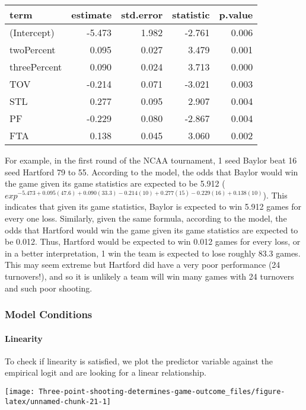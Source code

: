 \documentclass[
]{article}
\begin{document}
\begin{longtable}[]{@{}lrrrr@{}}
\toprule
term & estimate & std.error & statistic & p.value \\
\midrule
\endhead
(Intercept) & -5.473 & 1.982 & -2.761 & 0.006 \\
twoPercent & 0.095 & 0.027 & 3.479 & 0.001 \\
threePercent & 0.090 & 0.024 & 3.713 & 0.000 \\
TOV & -0.214 & 0.071 & -3.021 & 0.003 \\
STL & 0.277 & 0.095 & 2.907 & 0.004 \\
PF & -0.229 & 0.080 & -2.867 & 0.004 \\
FTA & 0.138 & 0.045 & 3.060 & 0.002 \\
\bottomrule
\end{longtable}

For example, in the first round of the NCAA tournament, 1 seed Baylor
beat 16 seed Hartford 79 to 55. According to the model, the odds that
Baylor would win the game given its game statistics are expected to be
5.912
(\(exp^{-5.473 + 0.095(47.6) + 0.090(33.3) - 0.214(10) + 0.277(15) - 0.229(16) + 0.138(10)}\)).
This indicates that given its game statistics, Baylor is expected to win
5.912 games for every one loss. Similarly, given the same formula,
according to the model, the odds that Hartford would win the game given
its game statistics are expected to be 0.012. Thus, Hartford would be
expected to win 0.012 games for every loss, or in a better
interpretation, 1 win the team is expected to lose roughly 83.3 games.
This may seem extreme but Hartford did have a very poor performance (24
turnovers!), and so it is unlikely a team will win many games with 24
turnovers and such poor shooting.

\hypertarget{model-conditions}{%
\subsubsection{Model Conditions}\label{model-conditions}}

\hypertarget{linearity}{%
\paragraph{Linearity}\label{linearity}}

To check if linearity is satisfied, we plot the predictor variable
against the empirical logit and are looking for a linear relationship.

\begin{center}\texttt{[image: Three-point-shooting-determines-game-outcome\_files/figure-latex/unnamed-chunk-21-1]} \end{center}
\end{document}
